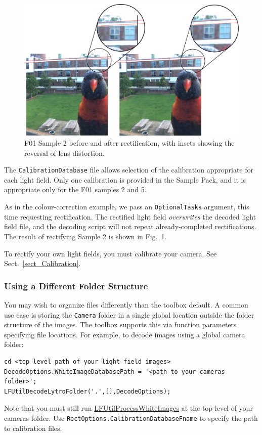\documentclass[onecolumn]{article}
\newcommand{\CiteFunc}[1]{\hyperlink{#1}{\small #1}}
\newcommand{\SymbolText}[1]{\texttt{\small #1}}
\begin{document}
\begin{figure}[tbh]
	\centering
	\includegraphics[width=1\textwidth]{Figs/Sample2_RectExample}
	\caption{F01 Sample 2 before and after rectification, with insets showing the reversal of lens distortion.}
	\label{fig_RectificationDetail}
\end{figure}

The \SymbolText{CalibrationDatabase} file allows selection of the calibration appropriate for each light field. Only one calibration is provided in the Sample Pack, and it is appropriate only for the F01 samples 2 and 5. 

As in the colour-correction example, we pass an \SymbolText{OptionalTasks} argument, this time requesting rectification. The rectified light field \emph{overwrites} the decoded light field file, and the decoding script will not repeat already-completed rectifications. The result of rectifying Sample 2 is shown in Fig.~\ref{fig_RectificationDetail}.

To rectify your own light fields, you must calibrate your camera.  See Sect.~\ref{sect_Calibration}.

\subsubsection{Using a Different Folder Structure}

You may wish to organize files differently than the toolbox default. A common use case is storing the \SymbolText{Camera} folder in a single global location outside the folder structure of the images.  The toolbox supports this via function parameters specifying file locations. For example, to decode images using a global camera folder:
\begin{Verbatim}
cd <top level path of your light field images>
DecodeOptions.WhiteImageDatabasePath = '<path to your cameras folder>';
LFUtilDecodeLytroFolder('.',[],DecodeOptions);
\end{Verbatim}
Note that you must still run \CiteFunc{LFUtilProcessWhiteImages} at the top level of your cameras folder. Use \SymbolText{RectOptions.CalibrationDatabaseFname} to specify the path to calibration files.
\end{document}
